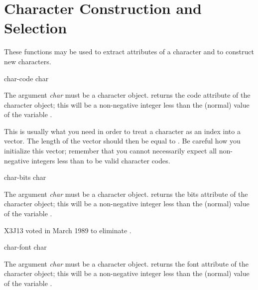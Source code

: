 \section{Character Construction and Selection}

These functions may be used to extract attributes of a character
and to construct new characters.

\begin{defun}[Function]
char-code char

The argument {\it char} must be a character object.
 returns the code attribute of the character object;
this will be a non-negative integer less than the (normal) value of
the variable .

\begin{new}
This is usually what you need in order to treat a character as an
index into a vector.  The length of the vector should then be
equal to .  Be careful how you initialize this
vector; remember that you cannot necessarily
expect all non-negative integers less than
 to be valid character codes.
\end{new}
\end{defun}


\begin{obsolete}
\begin{defun}[Function]
char-bits char

The argument {\it char} must be a character object.
 returns the bits attribute of the character object;
this will be a non-negative integer less than the (normal) value of
the variable .
\end{defun}
\end{obsolete}

\begin{newer}
X3J13 voted in March 1989 
to eliminate .
\end{newer}


\begin{obsolete}
\begin{defun}[Function]
char-font char

The argument {\it char} must be a character object.
 returns the font attribute of the character object;
this will be a non-negative integer less than the (normal) value of
the variable .
\end{defun}
\end{obsolete}

